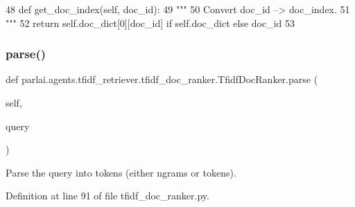 \begin{DoxyCode}
48     \textcolor{keyword}{def }get\_doc\_index(self, doc\_id):
49         \textcolor{stringliteral}{"""}
50 \textcolor{stringliteral}{        Convert doc\_id --> doc\_index.}
51 \textcolor{stringliteral}{        """}
52         \textcolor{keywordflow}{return} self.doc\_dict[0][doc\_id] \textcolor{keywordflow}{if} self.doc\_dict \textcolor{keywordflow}{else} doc\_id
53 
\end{DoxyCode}
\mbox{\label{classparlai_1_1agents_1_1tfidf__retriever_1_1tfidf__doc__ranker_1_1TfidfDocRanker_a44274f0f828a51c50c641317663e56eb}} 
\subsubsection{\texorpdfstring{parse()}{parse()}}
{\footnotesize\ttfamily def parlai.\+agents.\+tfidf\+\_\+retriever.\+tfidf\+\_\+doc\+\_\+ranker.\+Tfidf\+Doc\+Ranker.\+parse (\begin{DoxyParamCaption}\item[{}]{self,  }\item[{}]{query }\end{DoxyParamCaption})}

\begin{DoxyVerb}Parse the query into tokens (either ngrams or tokens).
\end{DoxyVerb}
 

Definition at line 91 of file tfidf\+\_\+doc\+\_\+ranker.\+py.


